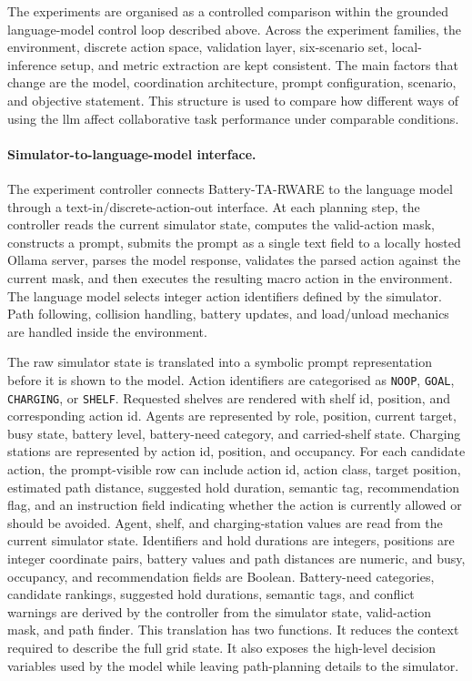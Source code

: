 The experiments are organised as a controlled comparison within the grounded language-model control loop described above.
Across the experiment families, the environment, discrete action space, validation layer, six-scenario set, local-inference setup, and metric extraction are kept consistent.
The main factors that change are the model, coordination architecture, prompt configuration, scenario, and objective statement.
This structure is used to compare how different ways of using the \gls{llm} affect collaborative task performance under comparable conditions.

\paragraph{Simulator-to-language-model interface.}
The experiment controller connects Battery-TA-RWARE to the language model through a text-in/discrete-action-out interface.
At each planning step, the controller reads the current simulator state, computes the valid-action mask, constructs a prompt, submits the prompt as a single text field to a locally hosted Ollama server, parses the model response, validates the parsed action against the current mask, and then executes the resulting macro action in the environment.
The language model selects integer action identifiers defined by the simulator.
Path following, collision handling, battery updates, and load/unload mechanics are handled inside the environment.

The raw simulator state is translated into a symbolic prompt representation before it is shown to the model.
Action identifiers are categorised as \texttt{NOOP}, \texttt{GOAL}, \texttt{CHARGING}, or \texttt{SHELF}.
Requested shelves are rendered with shelf id, position, and corresponding action id.
Agents are represented by role, position, current target, busy state, battery level, battery-need category, and carried-shelf state.
Charging stations are represented by action id, position, and occupancy.
For each candidate action, the prompt-visible row can include action id, action class, target position, estimated path distance, suggested hold duration, semantic tag, recommendation flag, and an instruction field indicating whether the action is currently allowed or should be avoided.
Agent, shelf, and charging-station values are read from the current simulator state. Identifiers and hold durations are integers, positions are integer coordinate pairs, battery values and path distances are numeric, and busy, occupancy, and recommendation fields are Boolean. Battery-need categories, candidate rankings, suggested hold durations, semantic tags, and conflict warnings are derived by the controller from the simulator state, valid-action mask, and path finder.
This translation has two functions.
It reduces the context required to describe the full grid state.
It also exposes the high-level decision variables used by the model while leaving path-planning details to the simulator.

